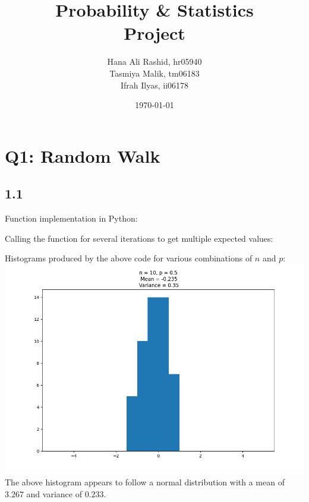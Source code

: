 \documentclass[answers]{exam}
\title{Probability \& Statistics\\ Project}
\author{Hana Ali Rashid, hr05940\\ Tasmiya Malik, tm06183\\ Ifrah Ilyas, ii06178}
\date{\today{}}
\begin{document}
\maketitle



\section*{Q1: Random Walk}
\subsection*{1.1}
Function implementation in Python:

Calling the function for several iterations to get multiple expected values:

\pagebreak
Histograms produced by the above code for various combinations of $n$ and $p$:\\
\includegraphics[scale = 0.5]{Q1_histograms/1.1/q1_n = 10_ p = 0.5.png}\\
The above histogram appears to follow a normal distribution with a mean of $3.267$ and variance of $0.233$.\\
\end{document}
